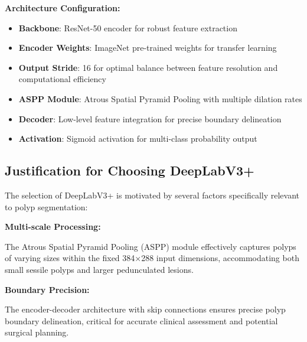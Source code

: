 \documentclass[a4paper,12pt]{report}
\begin{document}
\noindent\textbf{\large Architecture Configuration:}
\vspace{0.5em}

\begin{itemize}
    \item \textbf{Backbone}: ResNet-50 encoder for robust feature extraction
    \item \textbf{Encoder Weights}: ImageNet pre-trained weights for transfer learning
    \item \textbf{Output Stride}: 16 for optimal balance between feature resolution and computational efficiency
    \item \textbf{ASPP Module}: Atrous Spatial Pyramid Pooling with multiple dilation rates
    \item \textbf{Decoder}: Low-level feature integration for precise boundary delineation
    \item \textbf{Activation}: Sigmoid activation for multi-class probability output
\end{itemize}


\subsection{Justification for Choosing DeepLabV3+}

The selection of DeepLabV3+ is motivated by several factors specifically relevant to polyp segmentation:

\vspace{1em} %

\noindent\textbf{\normalsize Multi-scale Processing:}
\vspace{0.5em}

The Atrous Spatial Pyramid Pooling (ASPP) module effectively captures polyps of varying sizes within the fixed 384×288 input dimensions, accommodating both small sessile polyps and larger pedunculated lesions.

\vspace{1em} %

\noindent\textbf{\normalsize Boundary Precision:}
\vspace{0.5em}

The encoder-decoder architecture with skip connections ensures precise polyp boundary delineation, critical for accurate clinical assessment and potential surgical planning.
\end{document}
